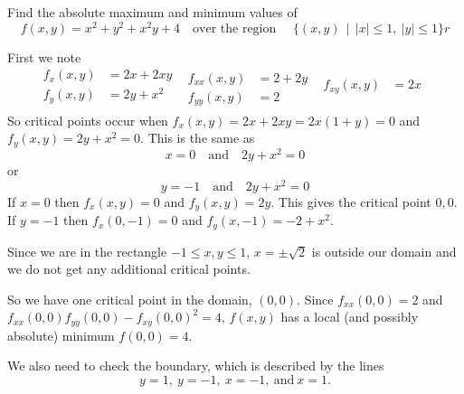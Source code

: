 \documentclass[12pt]{exam}
\begin{document}
\begin{questions}
\question Find the absolute maximum and minimum values of
\[
    f(x,y)=x^2+y^2+x^2y+4\quad\text{over the region }\quad
    \{ (x,y) ~~|~~ |x| \le1,~|y|\le1\}r
\]
    \ifprintanswers
        \begin{solution}
            First we note 
            \begin{equation*}
                \begin{aligned}
                    f_{x}(x,y) & = 2x+2xy\\
                    f_{y}(x,y) & = 2y+x^2\\
                \end{aligned}~~
                \begin{aligned}
                    f_{xx}(x,y)&=2+2y\\
                    f_{yy}(x,y)&=2
                \end{aligned}~~
                \begin{aligned}
                    f_{xy}(x,y)&= 2x\\
                        &
                \end{aligned}~~
            \end{equation*}
            So critical points occur when \(f_{x}(x,y)=2x+2xy=2x(1+y)=0\) and
            \(f_{y}(x,y)=2y+x^2=0\). 
            This is the same as 
            \[
                x=0 \quad \text{and}\quad 2y+x^2=0
            \]
            or
            \[
                y=-1 \quad \text{and}\quad 2y+x^2=0
            \]
            If \(x=0\) then \(f_x(x,y)=0\) and \(f_y(x,y)=2y\). This gives the critical point \(0,0\). If \(y=-1\) then \(f_{x}(0,-1)=0\) and \(f_{y}(x,-1)=-2+x^2\). 

            Since we are in the rectangle \(-1\le x,y\le 1\), \(x=\pm\sqrt{2}\) is outside our domain and we do not get any additional critical points.

            So we have one critical point in the domain, \((0,0)\). 
            Since \(f_{xx}(0,0)=2\) and \(f_{xx}(0,0)f_{yy}(0,0)-f_{xy}(0,0)^2=4\), \(f(x,y)\) has a local (and possibly absolute) minimum \(f(0,0)=4\).

            We also need to check the boundary, which is described by the lines
            \[ 
                y=1,~y=-1,~x=-1,~\text{and}~x=1.
            \]
            \begin{center}
            \end{center}


\end{solution}
\end{questions}
\end{document}
